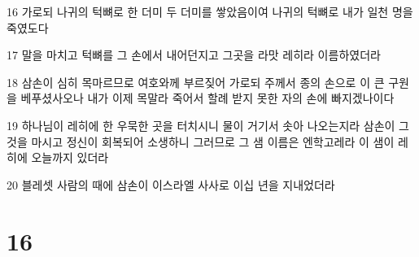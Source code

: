 \par 16 가로되 나귀의 턱뼈로 한 더미 두 더미를 쌓았음이여 나귀의 턱뼈로 내가 일천 명을 죽였도다
\par 17 말을 마치고 턱뼈를 그 손에서 내어던지고 그곳을 라맛 레히라 이름하였더라
\par 18 삼손이 심히 목마르므로 여호와께 부르짖어 가로되 주께서 종의 손으로 이 큰 구원을 베푸셨사오나 내가 이제 목말라 죽어서 할례 받지 못한 자의 손에 빠지겠나이다
\par 19 하나님이 레히에 한 우묵한 곳을 터치시니 물이 거기서 솟아 나오는지라 삼손이 그것을 마시고 정신이 회복되어 소생하니 그러므로 그 샘 이름은 엔학고레라 이 샘이 레히에 오늘까지 있더라
\par 20 블레셋 사람의 때에 삼손이 이스라엘 사사로 이십 년을 지내었더라

\chapter{16}

